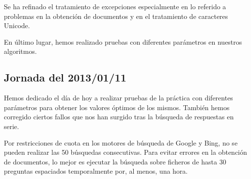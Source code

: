 \documentclass[12pt,a4paper,titlepage]{article}
\begin{document}
Se ha refinado el tratamiento de excepciones especialmente en lo referido a problemas en la obtención de documentos y en el tratamiento de caracteres Unicode.

En último lugar, hemos realizado pruebas con diferentes parámetros en nuestros algoritmos.

\subsection{Jornada del 2013/01/11}
Hemos dedicado el día de hoy a realizar pruebas de la práctica con diferentes parámetros para obtener los valores óptimos de los mismos. También hemos corregido ciertos fallos que nos han surgido tras la búsqueda de respuestas en serie.

Por restricciones de cuota en los motores de búsqueda de Google y Bing, no se pueden realizar las 50 búsquedas consecutivas. Para evitar errores en la obtención de documentos, lo mejor es ejecutar la búsqueda sobre ficheros de hasta 30 preguntas espaciados temporalmente por, al menos, una hora.

\clearpage
\end{document}
